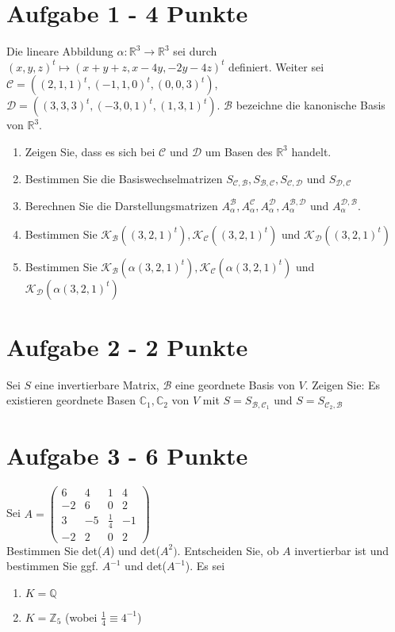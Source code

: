 \section*{Aufgabe 1 - 4 Punkte}
Die lineare Abbildung $\alpha: \mathbb{R}^3 \rightarrow \mathbb{R}^3$ sei durch $(x,y,z)^t \mapsto (x+y+z,x-4y,-2y-4z)^t$ definiert. Weiter sei $\mathcal{C} = ((2,1,1)^t, (-1,1,0)^t,(0,0,3)^t)$, $\mathcal{D} = ((3,3,3)^t,(-3,0,1)^t, (1,3,1)^t)$. $\mathcal{B}$ bezeichne die kanonische Basis von $\mathbb{R}^3$.
\begin{enumerate}[label=\alph*)]
\item Zeigen Sie, dass es sich bei $\mathcal{C}$ und $\mathcal{D}$ um Basen des $\mathbb{R}^3$ handelt.\\
\item Bestimmen Sie die Basiswechselmatrizen $S_{\mathcal{C},\mathcal{B}}, S_{\mathcal{B},\mathcal{C}}, S_{\mathcal{C},\mathcal{D}}$ und $S_{\mathcal{D},\mathcal{C}}$
\item Berechnen Sie die Darstellungsmatrizen $A_{\alpha}^{\mathcal{B}},A_{\alpha}^{\mathcal{C}},A_{\alpha}^{\mathcal{D}},A_{\alpha}^{\mathcal{B},\mathcal{D}}$ und $A_{\alpha}^{\mathcal{D},\mathcal{B}}$.
\item Bestimmen Sie $\mathcal{K}_\mathcal{B} ((3,2,1)^t),\mathcal{K}_\mathcal{C} ((3,2,1)^t)$ und $\mathcal{K}_\mathcal{D} ((3,2,1)^t)$
\item Bestimmen Sie $\mathcal{K}_\mathcal{B} (\alpha(3,2,1)^t),\mathcal{K}_\mathcal{C} (\alpha(3,2,1)^t)$ und $\mathcal{K}_\mathcal{D} (\alpha(3,2,1)^t)$

\end{enumerate}
 

\section*{Aufgabe 2 - 2 Punkte}
Sei $S$ eine invertierbare Matrix, $\mathcal{B}$ eine geordnete Basis von $V$. Zeigen Sie: Es existieren geordnete Basen $\mathbb{C}_1,\mathbb{C}_2$ von $V$ mit $S = S_{\mathcal{B}, \mathcal{C}_{1}}$ und
 $S = S_{ \mathcal{C}_2, \mathcal{B}}$


\section*{Aufgabe 3 - 6 Punkte}
Sei $A = \begin{pmatrix}
6&4&1&4\\
-2&6&0&2\\
3&-5&\frac{1}{4}&-1\\
-2&2&0&2
\end{pmatrix}$\\
Bestimmen Sie det($A$) und det($A^2)$. Entscheiden Sie, ob $A$ invertierbar ist und bestimmen Sie ggf. $A^{-1}$ und det($A^{-1}$). Es sei
\begin{enumerate}[label=\alph*)]
\item $K = \mathbb{Q}$
\item $K = \mathbb{Z}_5$ (wobei $\frac{1}{4} \equiv 4^{-1}$)

\end{enumerate}

